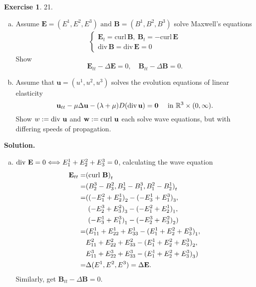 \message{ !name(PDE-hw5-21935004-\unexpanded{谭焱}.tex)}\documentclass[a4paper]{book}
\newenvironment{solution}%
{\noindent\textbf{Solution.}}%
{\qedhere}
\numberwithin{equation}{chapter}
\theoremstyle{definition}
\newtheorem{exc}[exm]{Exercise}
\begin{document}
\begin{multicols}{2}
\begin{exc}
  21.
  \begin{enumerate} [(a)]
  \item Assume $\mathbf{E} = (E^1, E^2, E^3) \text{ and } \mathbf{B} = (B^1, B^2, B^3)$ solve Maxwell's equations
    \begin{align}
      \begin{cases}
        \mathbf{E}_t = \mathrm{curl} \, \mathbf{B}, \ \mathbf{B}_t = - \mathrm{curl} \, \mathbf{E} \\
        \mathrm{div} \, \mathbf{B} = \mathrm{div} \, \mathbf{E} = 0
      \end{cases}
    \end{align}
    Show
    \begin{equation*}
      \mathbf{E}_{tt} - \Delta \mathbf{E} = 0, \quad \mathbf{B}_{tt} - \Delta \mathbf{B} = 0.
    \end{equation*}

  \item Assume that $\mathbf{u} = (u^1, u^2, u^3)$ solves the evolution equations of linear elasticity 
    \begin{equation}
      \label{eq:4}
      \mathbf{u}_{tt} - \mu \Delta \mathbf{u} - (\lambda + \mu) D(\mathrm{div}\, \mathbf{u}) = \mathbf{0} \quad \textmd{ in } \mathbb{R}^3 \times (0, \infty). 
    \end{equation}
    Show $w := \textmd{div } \mathbf{u}$ and $\mathbf{w} := \textmd{curl } \mathbf{u}$ each solve wave equations, but with differing speeds of propagation.
  \end{enumerate}
\end{exc}

\begin{solution}
  \begin{enumerate} [(a)]
  \item $\textmd{div } \mathbf{E} = 0 \Longleftrightarrow E^1_1 + E^2_2 + E^3_3 = 0$, calculating the wave equation  
    \begin{align*}
      \mathbf{E}_{tt} = &{(\textmd{curl } \mathbf{B})}_t \\
      = &{(B^3_2 - B^2_3, B^1_3 - B^3_1, B^2_1 - B^1_2)}_t \\
      = &({(- E^2_1 + E^1_2)}_2 - {(- E^1_3 + E^3_1)}_3,  \\
                        &\ {(- E^3_2 + E^2_3)}_3 - {(- E^2_1 + E^1_2)}_1,  \\
                        &\ {(- E^1_3 + E^3_1)}_1 - {(- E^3_2 + E^2_3)}_2)  \\
      = &(E^1_{11} + E^1_{22} + E^1_{33} - {(E^1_1 + E^2_2 + E^3_3)}_1,  \\
                        & E^2_{11} + E^2_{22} + E^2_{33} - {(E^1_1 + E^2_2 + E^3_3)}_2,  \\
                        & E^3_{11} + E^3_{22} + E^3_{33} - {(E^1_1 + E^2_2 + E^3_3)}_3)  \\
      = & \Delta (E^1, E^2, E^3) = \Delta \mathbf{E}.
    \end{align*}
    Similarly, get $\mathbf{B}_{tt} - \Delta \mathbf{B} = 0$.


\end{enumerate}
\end{solution}
\end{multicols}
\end{document}
